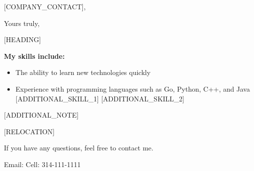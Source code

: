 

\date{\today}
\opening{[COMPANY_CONTACT],}
\closing{Yours truly,}
\makelettertitle

\setlength{\parindent}{0pt}
\newcommand{\forceindent}{\leavevmode{\parindent=0.6cm\indent}}

[HEADING] \newline

\textbf{My skills include:}
\begin{itemize}
  \item The ability to learn new technologies quickly
  \item Experience with programming languages such as Go, Python, C++, and Java
  [ADDITIONAL_SKILL_1]
  [ADDITIONAL_SKILL_2]
\end{itemize}

[ADDITIONAL_NOTE]

[RELOCATION]

If you have any questions, feel free to contact me.

Email:  \newline
Cell: 314-111-1111

\makeletterclosing

